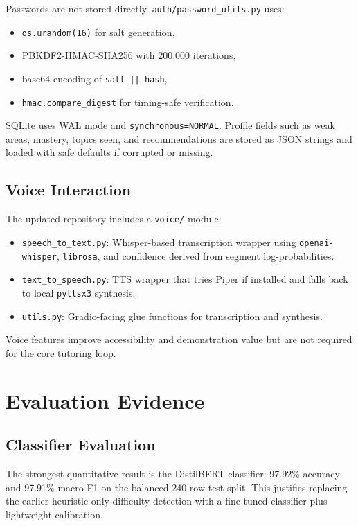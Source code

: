 \documentclass[11pt,a4paper]{article}
\begin{document}
Passwords are not stored directly. \texttt{auth/password\_utils.py} uses:

\begin{itemize}
    \item \texttt{os.urandom(16)} for salt generation,
    \item PBKDF2-HMAC-SHA256 with 200,000 iterations,
    \item base64 encoding of \texttt{salt || hash},
    \item \texttt{hmac.compare\_digest} for timing-safe verification.
\end{itemize}

SQLite uses WAL mode and \texttt{synchronous=NORMAL}. Profile fields such as weak areas, mastery, topics seen, and recommendations are stored as JSON strings and loaded with safe defaults if corrupted or missing.

\subsection{Voice Interaction}

The updated repository includes a \texttt{voice/} module:

\begin{itemize}
    \item \texttt{speech\_to\_text.py}: Whisper-based transcription wrapper using \texttt{openai-whisper}, \texttt{librosa}, and confidence derived from segment log-probabilities.
    \item \texttt{text\_to\_speech.py}: TTS wrapper that tries Piper if installed and falls back to local \texttt{pyttsx3} synthesis.
    \item \texttt{utils.py}: Gradio-facing glue functions for transcription and synthesis.
\end{itemize}

Voice features improve accessibility and demonstration value but are not required for the core tutoring loop.

\section{Evaluation Evidence}

\subsection{Classifier Evaluation}

The strongest quantitative result is the DistilBERT classifier: 97.92\% accuracy and 97.91\% macro-F1 on the balanced 240-row test split. This justifies replacing the earlier heuristic-only difficulty detection with a fine-tuned classifier plus lightweight calibration.
\end{document}
